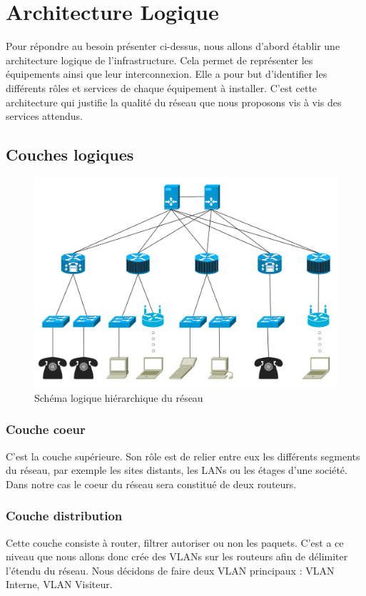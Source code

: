 \section{Architecture Logique}

Pour répondre au besoin présenter ci-dessus, nous allons d'abord établir une architecture logique de l'infrastructure.
Cela permet de représenter les équipements ainsi que leur interconnexion.
Elle a pour but d'identifier les différents rôles et services de chaque équipement à installer.
C'est cette architecture qui justifie la qualité du réseau que nous proposons vis à vis des services attendus.

%
%
\subsection{Couches logiques}

\begin{figure}[!ht]
    \center
    \includegraphics[width=1\textwidth]{./images/schema-logique.png}
    \caption{Schéma logique hiérarchique du réseau}
\end{figure}

%
    \cleardoublepage
%

\subsubsection{Couche coeur}
C'est la couche supérieure.
Son rôle est de relier entre eux les différents segments du réseau, par exemple les sites distants, les LANs ou les étages d'une société.
Dans notre cas le coeur du réseau sera constitué de deux routeurs.

\subsubsection{Couche distribution}
Cette couche consiste à router, filtrer autoriser ou non les paquets.
C'est a ce niveau que nous allons donc crée des VLANs sur les routeurs afin de délimiter l'étendu du réseau.
Nous décidons de faire deux VLAN principaux : VLAN Interne, VLAN Visiteur.

